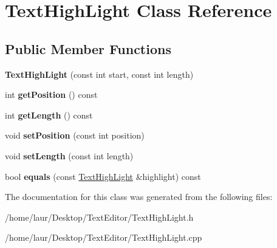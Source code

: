 \hypertarget{class_text_high_light}{}\section{Text\+High\+Light Class Reference}
\label{class_text_high_light}
\subsection*{Public Member Functions}
\begin{DoxyCompactItemize}
\item 
\mbox{\label{class_text_high_light_aa0846a7564121cc66bf0bc13aa054640}} 
{\bfseries Text\+High\+Light} (const int start, const int length)
\item 
\mbox{\label{class_text_high_light_a16c3c269cab5723c395c32415cfd00de}} 
int {\bfseries get\+Position} () const
\item 
\mbox{\label{class_text_high_light_a6259545933a8d793e39471183ef5987c}} 
int {\bfseries get\+Length} () const
\item 
\mbox{\label{class_text_high_light_a86a623ae72f2a72e26e90c052b5f624b}} 
void {\bfseries set\+Position} (const int position)
\item 
\mbox{\label{class_text_high_light_ac5705571bb13c119366445720f0ac854}} 
void {\bfseries set\+Length} (const int length)
\item 
\mbox{\label{class_text_high_light_a5601764db019d24c9b07d16760534ae8}} 
bool {\bfseries equals} (const \hyperlink{class_text_high_light}{Text\+High\+Light} \&highlight) const
\end{DoxyCompactItemize}


The documentation for this class was generated from the following files\+:\begin{DoxyCompactItemize}
\item 
/home/laur/\+Desktop/\+Text\+Editor/Text\+High\+Light.\+h\item 
/home/laur/\+Desktop/\+Text\+Editor/Text\+High\+Light.\+cpp\end{DoxyCompactItemize}
